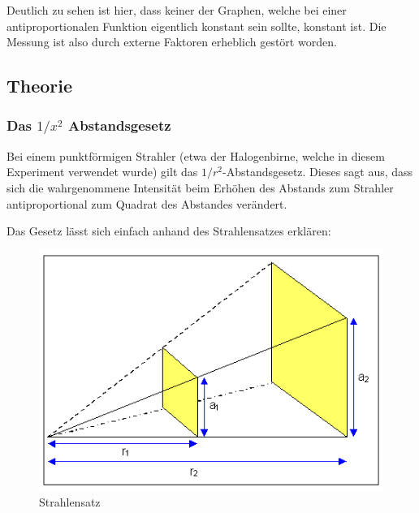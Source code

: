 \documentclass[12pt, a4paper]{article}
\begin{document}

\vspace{10mm}

Deutlich zu sehen ist hier, dass keiner der Graphen, welche bei einer antiproportionalen Funktion eigentlich konstant sein sollte, konstant ist. Die Messung ist also durch externe Faktoren erheblich gestört worden.

\subsection{Theorie}
\subsubsection{Das $1 / x^2$ Abstandsgesetz}
Bei einem punktförmigen Strahler (etwa der Halogenbirne, welche in diesem Experiment verwendet wurde) gilt das $1/r^2$-Abstandsgesetz.
Dieses sagt aus, dass sich die wahrgenommene Intensität beim Erhöhen des Abstands zum Strahler antiproportional zum Quadrat des Abstandes verändert.

Das Gesetz lässt sich einfach anhand des Strahlensatzes erklären:

\newpage

\begin{figure}[h]
    \includegraphics[width=\textwidth]{Strahlensatz.png} %
    \caption[Strahlensatz]{Strahlensatz}
\end{figure}
\end{document}
